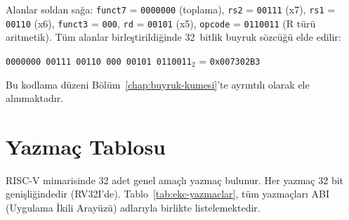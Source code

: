 Alanlar soldan sağa: \texttt{funct7} = \texttt{0000000} (toplama), \texttt{rs2} = \texttt{00111} (x7), \texttt{rs1} = \texttt{00110} (x6), \texttt{funct3} = \texttt{000}, \texttt{rd} = \texttt{00101} (x5), \texttt{opcode} = \texttt{0110011} (R türü aritmetik). Tüm alanlar birleştirildiğinde 32~bitlik buyruk sözcüğü elde edilir:

\begin{center}
\texttt{0000000\,00111\,00110\,000\,00101\,0110011}$_2$ = \texttt{0x00730\allowbreak 2B3}
\end{center}

Bu kodlama düzeni Bölüm~\ref{chap:buyruk-kumesi}'te ayrıntılı olarak ele alınmaktadır.

\section{Yazmaç Tablosu}
\label{sec:ekc-yazmaclar}

RISC-V mimarisinde 32 adet genel amaçlı yazmaç bulunur. Her yazmaç 32 bit genişliğindedir (RV32I'de). Tablo~\ref{tab:ekc-yazmaclar}, tüm yazmaçları ABI (Uygulama İkili Arayüzü) adlarıyla birlikte listelemektedir.

